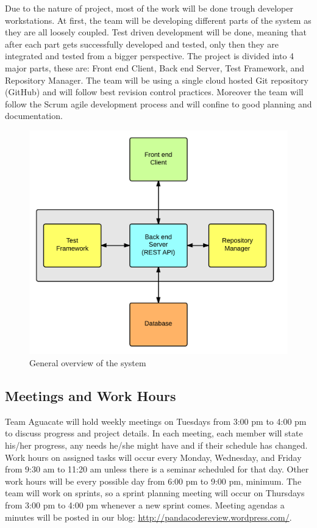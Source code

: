 
Due to the nature of project, most of the work will be done trough developer
workstations. At first, the team will be developing different parts of the
system as they are all loosely coupled. Test driven development will be done,
meaning that after each part gets successfully developed and tested, only then
they are integrated and tested from a bigger perspective. The project is divided
into 4 major parts, these are: Front end Client, Back end Server, Test
Framework, and Repository Manager. The team will be using a single cloud hosted
Git repository (GitHub) and will follow best revision control practices.
Moreover the team will follow the Scrum agile development process and will
confine to good planning and documentation.

\begin{figure}[H]
	\centering
	\includegraphics[width=\textwidth]{img/bigArquitectOverview}
	\caption{General overview of the system}
\end{figure}

\subsection{Meetings and Work Hours}

Team Aguacate will hold weekly meetings on Tuesdays from 3:00 pm to 4:00 pm to
discuss progress and project details. In each meeting, each member will state
his/her progress, any needs he/she might have and if their schedule has changed.
Work hours on assigned tasks will occur every Monday, Wednesday, and Friday from
9:30 am to 11:20 am unless there is a seminar scheduled for that day. Other work
hours will be every possible day from 6:00 pm to 9:00 pm, minimum. The team will
work on sprints, so a sprint planning meeting will occur on Thursdays from 3:00
pm to 4:00 pm whenever a new sprint comes.  Meeting agendas a minutes will be
posted in our blog: \url{http://pandacodereview.wordpress.com/}.

